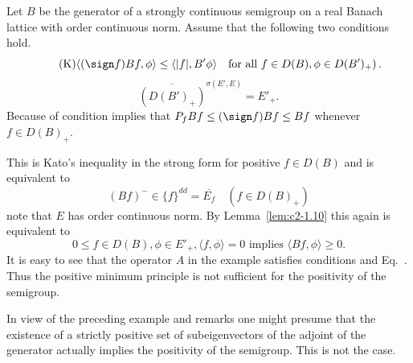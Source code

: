 \begin{remark}\label{rem:c2-3.16}
Let $B$ be the generator of a strongly continuous semigroup on a real Banach lattice with order continuous norm. Assume that the following two conditions hold.
\begin{equation} \label{eq:c2-3.17-K} \tag{K}
\langle(\sign  f)Bf,\phi\rangle \leq \langle|f|,B'\phi\rangle \quad\text{for all } f \in D(B),  \phi \in D(B')_{+})\,.
\end{equation}
\begin{equation}
\overline{(D(B')_{+})}^{\sigma(E',E)} = E'_{+}. \label{eq:c2-3.17}
\end{equation}
Because of  condition  implies that $P_{f}Bf \leq (\sign  f)Bf \leq Bf$
whenever $f \in D(B)_{+}$.

This is Kato's inequality in the strong form for positive $f \in D(B)$ and is equivalent to 
\[
(Bf)^{-} \in \{f\}^{dd} = \overline{E_f} \quad (f \in D(B)_{+})
\]
note that $E$ has order continuous norm. By Lemma~\ref{lem:c2-1.10}  this again is equivalent to
\begin{equation}\label{eq:c2-P2} \tag{P}
0 \leq f \in D(B),  \phi \in E'_{+},  \langle f,\phi \rangle = 0 \text{ implies } \langle Bf,\phi \rangle \geq 0.
\end{equation}
It is easy to see that the operator $A$ in the example satisfies conditions   and Eq.~. Thus the positive minimum principle  is not sufficient for the positivity of the semigroup.
\end{remark}
In view of the preceding example and remarks one might presume that the existence of a strictly positive set of subeigenvectors of the adjoint of the generator actually implies the positivity of the semigroup. 
This is not the case.

